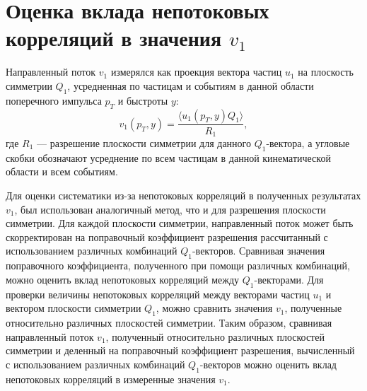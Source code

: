 \section{Оценка вклада непотоковых корреляций в значения $v_1$}

Направленный поток $v_1$ измерялся как проекция вектора частиц $u_1$ на плоскость симметрии $Q_1$, усредненная по частицам и событиям в данной области поперечного импульса $p_T$ и быстроты $y$:
\begin{equation}
    v_1(p_T, y) = \frac{ \langle u_1(p_T, y) Q_1 \rangle }{ R_1 },
\end{equation}
где $R_1$ --- разрешение плоскости симметрии для данного $Q_1$-вектора, а угловые скобки обозначают усреднение по всем частицам в данной кинематической области и всем событиям.

Для оценки систематики из-за непотоковых корреляций в полученных результатах $v_1$, был использован аналогичный метод, что и для разрешения плоскости симметрии. 
Для каждой плоскости симметрии, направленный поток может быть скорректирован на поправочный коэффициент разрешения рассчитанный с использованием различных комбинаций $Q_1$-векторов.
Сравнивая значения поправочного коэффициента, полученного при помощи различных комбинаций, можно оценить вклад непотоковых корреляций между $Q_1$-векторами.
Для проверки величины непотоковых корреляций между векторами частиц $u_1$ и вектором плоскости симметрии $Q_1$, можно сравнить значения $v_1$, полученные относительно различных плоскостей симметрии.
Таким образом, сравнивая направленный поток $v_1$, полученный относительно различных плоскостей симметрии и деленный на поправочный коэффициент разрешения, вычисленный с использованием различных комбинаций $Q_1$-векторов можно оценить вклад непотоковых корреляций в измеренные значения $v_1$.

